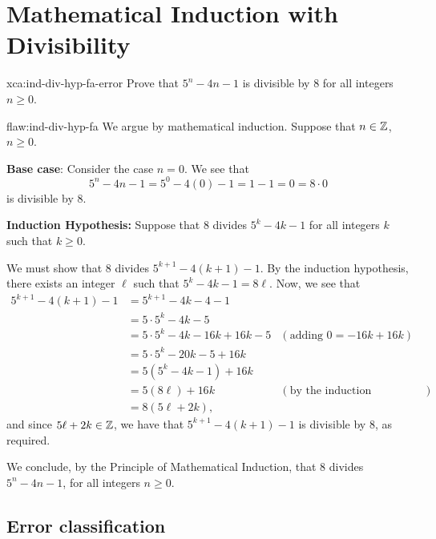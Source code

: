 \section{Mathematical Induction with Divisibility}

\begin{xca}[Multiples of $8$]{xca:ind-div-hyp-fa-error}
Prove that $5^n-4n-1$ is divisible by $8$ for all integers $n\geq 0$. 
\end{xca}

\begin{flaw}{flaw:ind-div-hyp-fa} 
We argue by mathematical induction.
Suppose that $n \in \mathbb Z$, $n\geq 0$.

\noindent \textbf{Base case}: Consider the case $n=0$.  We see that 
\[ 5^n - 4n - 1 = 5^0 - 4(0) - 1 = 1-1 = 0 = 8\cdot 0 \]
is divisible by $8$.

\noindent \textbf{Induction Hypothesis:} Suppose that $8$ divides $5^k - 4k -1$ for all integers $k$ such that $k\geq 0$.

We must show that $8$ divides $5^{k+1} - 4(k+1) -1$.
By the induction hypothesis, there exists an integer $\ell$ such that $5^k-4k-1 = 8\ell$.
Now, we see that
\begin{align*}
	5^{k+1} - 4(k+1) -1 & = 5^{k+1} - 4k -4 - 1 \\
	& = 5\cdot 5^k -4k -5 \\
	& = 5\cdot 5^k -4k - 16k + 16k -5 & (\text{adding $0=-16k+16k$})\\
	& = 5\cdot 5^k - 20k - 5 + 16k \\
	& = 5(5^k -4k -1) + 16 k \\
	& = 5(8\ell) + 16 k & (\text{by the induction hypothesis})\\
	& = 8(5\ell + 2k),
\end{align*}
and since $5\ell + 2k \in \mathbb Z$, we have that $5^{k+1} - 4(k+1) -1$ is divisible by $8$, as required.

We conclude, by the Principle of Mathematical Induction, that $8$ divides $5^n-4n-1$, for all integers $n\geq 0$.
\end{flaw}

\clearpage
\subsection{Error classification}

